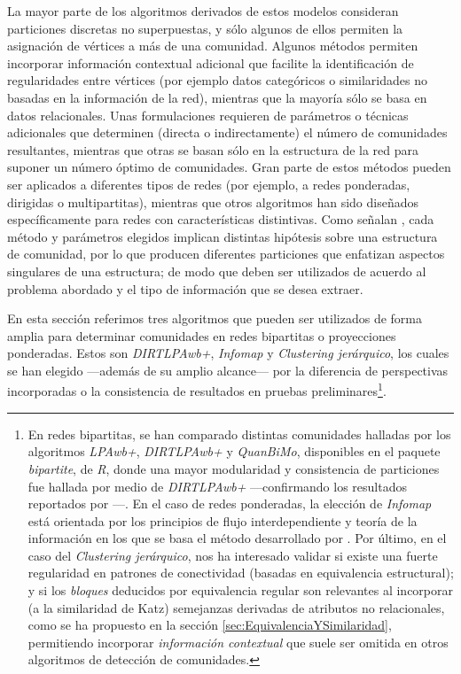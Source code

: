 \documentclass[letterpaper, 11pt]{book}
\theoremstyle{definition}
\theoremstyle{remark}
\begin{document}
La mayor parte de los algoritmos derivados de estos modelos consideran particiones discretas no superpuestas, y sólo algunos de ellos permiten la asignación de vértices a más de una comunidad. 
Algunos métodos permiten incorporar información contextual adicional que facilite la identificación de regularidades entre vértices (por ejemplo datos categóricos o similaridades no basadas en la información de la red), mientras que la mayoría sólo se basa en datos relacionales. 
Unas formulaciones requieren de parámetros o técnicas adicionales que determinen (directa o indirectamente) el número de comunidades resultantes, mientras que otras se basan sólo en la estructura de la red para suponer un número óptimo de comunidades. 
Gran parte de estos métodos pueden ser aplicados a diferentes tipos de redes (por ejemplo, a redes ponderadas, dirigidas o multipartitas), mientras que otros algoritmos han sido diseñados específicamente para redes con características distintivas. 
Como señalan \citet{2009_Rosvall_MapEquation}, cada método y parámetros elegidos implican distintas hipótesis sobre una estructura de comunidad, por lo que producen diferentes particiones que enfatizan aspectos singulares de una estructura; de modo que deben ser utilizados de acuerdo al problema abordado y el tipo de información que se desea extraer. 


En esta sección referimos tres algoritmos que pueden ser utilizados de forma amplia para determinar comunidades en redes bipartitas o proyecciones ponderadas. 
Estos son \emph{DIRTLPAwb+}, \emph{Infomap} y \emph{Clustering jerárquico}, los cuales se han elegido ---además de su amplio alcance--- por la diferencia de perspectivas incorporadas o la consistencia de resultados en pruebas preliminares\footnote{
    En redes bipartitas, se han comparado distintas comunidades halladas por los algoritmos \emph{LPAwb+}, \emph{DIRTLPAwb+} y \emph{QuanBiMo}, disponibles en el paquete \emph{bipartite}, de \emph{R}, donde una mayor modularidad y consistencia de particiones fue hallada por medio de \emph{DIRTLPAwb+} ---confirmando los resultados reportados por \citet{2016_Beckett_ComunidadesBipatitas}---. 
    En el caso de redes ponderadas, la elección de \emph{Infomap} está orientada por los principios de flujo interdependiente y teoría de la información en los que se basa el método desarrollado por \citet{2009_Rosvall_MapEquation}. 
    Por último, en el caso del \emph{Clustering jerárquico}, nos ha interesado validar si existe una fuerte regularidad en patrones de conectividad (basadas en equivalencia estructural); y si los \emph{bloques} deducidos por equivalencia regular son relevantes al incorporar (a la similaridad de Katz) semejanzas derivadas de atributos no relacionales, como se ha propuesto en la sección \ref{sec:EquivalenciaYSimilaridad}, permitiendo incorporar \emph{información contextual} que suele ser omitida en otros algoritmos de detección de comunidades.
}. 
\end{document}

